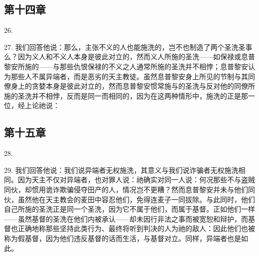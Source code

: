 
\subsection{第十四章}

26. \par

27. 我们回答他说：那么，主张不义的人也能施洗的，岂不也制造了两个圣洗圣事么？因为义人和不义人本身是彼此对立的，然而义人所施的圣洗——如保禄或息普黎安所施的——与那些仇恨保禄的不义之人通常所施的圣洗并不相悖；息普黎安认为那些人不属异端者，而是恶劣的天主教徒。虽然息普黎安身上所见的节制与其同僚身上的贪婪本身是彼此对立的，然而息普黎安惯常施与的圣洗与反对他的同僚所施的圣洗并不相悖，反而是同一而相同的，因为在这两种情形中，施洗的正是那一位，经上论祂说：\par


\subsection{第十五章}

28. \par

29. 我们回答他说：我们说异端者无权施洗，其意义与我们说诈骗者无权施洗相同。因为天主不仅对异端者，也对罪人说：祂确实对同一人说：何况那些不与盗贼同伙，却惯用诡诈欺骗侵夺田产的人，情况岂不更糟？然而息普黎安并未与他们同伙，虽然他在天主教会的麦田中容忍他们，免得连麦子一同拔除。与此同时，他们自己所施的圣洗正是同一个圣洗，因为它不属于他们，而属于基督。正如他们一样——虽然基督的圣洗在他们内被承认——却未因行非法之事而被宽恕和辩护，而基督也正确地称那些坚持此类行为、最终将听到判决的人为祂的敌人：因此他们也被称为假基督，因为他们违反基督的话而生活，与基督对立。同样，异端者也是如此。\par


